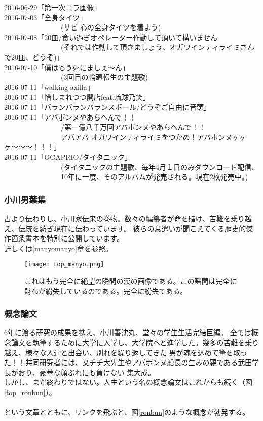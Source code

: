 2016-06-29「第一次コラ画像」 \\
2016-07-03「全身タイツ」\\
 \ \ \ \ \ \ \ \ \ \ \ \ \ \ \ \ (サビ 心の全身タイツを着よう)\\
2016-07-08「20皿/食い過ぎオペレーター作動して頂いて構いません\\ 
 \ \ \ \ \ \ \ \ \ \ \ \ \ \ \ \ (それでは作動して頂きましょう、オガワインティライミさんで20皿、どうぞ)」\\ 
2016-07-10「僕はもう死にましぇ〜ん」\\
 \ \ \ \ \ \ \ \ \ \ \ \ \ \ \ \ (3回目の輪廻転生の主題歌) \\
2016-07-11「walking axilla」 \\
2016-07-11「惜しまれつつ開店feat.琉球乃笑」\\ 
2016-07-11「バランバランバランスボール/どうぞご自由に音頭」\\ 
2016-07-11「アバポンヌやあらへんで！！\\
 \ \ \ \ \ \ \ \ \ \ \ \ \ \ \ \ /第一億八千万回アバポンヌやあらへんで！！\\
  \ \ \ \ \ \ \ \ \ \ \ \ \ \ \ \ アバアバ オガワインティライミをつかめ！アバポンヌヶヶヶ〜〜〜！！！」 \\
2016-07-11「OGAPRIO/タイタニック」\\
 \ \ \ \ \ \ \ \ \ \ \ \ \ \ \ \ (タイタニックの主題歌、毎年4月１日のみダウンロード配信、\\
  \ \ \ \ \ \ \ \ \ \ \ \ \ \ \ \ 10年に一度、そのアルバムが発売される。現在2枚発売中。)\\

\subsubsection{小川男葉集}
古より伝わりし、小川家伝来の巻物。数々の編纂者が命を賭け、苦難を乗り越え、伝統を紡ぎ現在に伝わっています。 彼らの息遣いが聞こえてくる歴史的傑作箇条書本を特別に公開しています。\\
詳しくは\ref{manyomanyo}章を参照。\\

\begin{figure}[H]
  \centering
  \texttt{[image: top\_manyo.png]}
  \caption{これはもう完全に絶望の瞬間の漢の画像である。この瞬間は完全に財布が紛失しているのである。完全に紛失である。}
\label{top_manyo}
\end{figure}

\subsubsection{概念論文}
6年に渡る研究の成果を携え、小川善沈丸、堂々の学生生活完結巨編。 全ては概念論文を執筆するために大学に入学し、大学院へと進学した。幾多の苦難を乗り越え、様々な人達と出会い、別れを繰り返してきた 男が魂を込めて筆を取った！！共同研究者には、又チチ大先生やアバポンヌ船長の生みの親である武田学長がおり、豪華な顔ぶれにも負けない 集大成。\\
しかし、まだ終わりではない。人生という名の概念論文はこれからも続く（図\ref{top_ronbun}）。\\
 \\
という文章とともに、リンクを飛ぶと、図\ref{ronbun}のような概念が勃発する。

